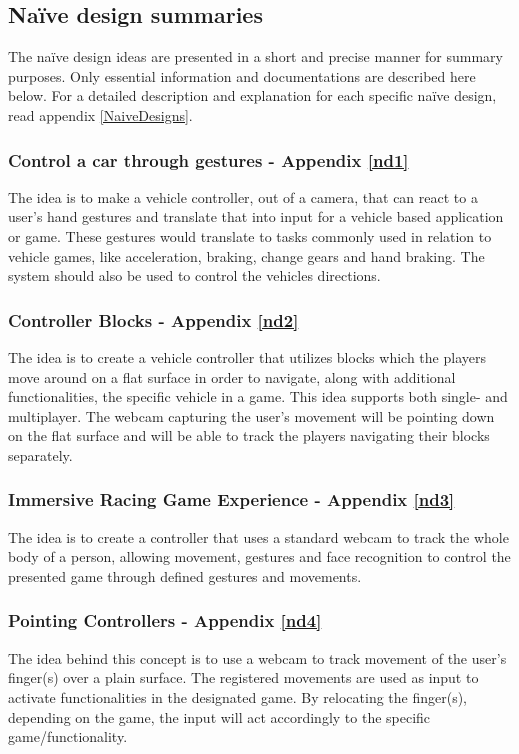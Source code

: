 \subsection{Naïve design summaries}
The naïve design ideas are presented in a short and precise manner for summary purposes. Only essential information and documentations are described here below. For a detailed description and explanation for each specific naïve design, read appendix \ref{NaiveDesigns}. 

\subsubsection{Control a car through gestures - Appendix \ref{nd1}}
 The idea is to make a vehicle controller, out of a camera, that can react to a user's hand gestures and translate that into input for a vehicle based application or game. These gestures would translate to tasks commonly used in relation to vehicle games, like acceleration, braking, change gears and hand braking. The system should also be used to control the vehicles directions.

\subsubsection{Controller Blocks - Appendix \ref{nd2}}
The idea is to create a vehicle controller that utilizes blocks which the players move around on a flat surface in order to navigate, along with additional functionalities, the specific vehicle in a game. This idea supports both single- and multiplayer. The webcam capturing the user's movement will be pointing down on the flat surface and will be able to track the players navigating their blocks separately.

\subsubsection{Immersive Racing Game Experience - Appendix \ref{nd3}}
The idea is to create a controller that uses a standard webcam to track the whole body of a person, allowing movement, gestures and face recognition to control the presented game through defined gestures and movements.

\subsubsection{Pointing Controllers - Appendix \ref{nd4}}
The idea behind this concept is to use a webcam to track movement of the user's finger(s) over a plain surface. The registered movements are used as input to activate functionalities in the designated game. By relocating the finger(s), depending on the game, the input will act accordingly to the specific game/functionality.

